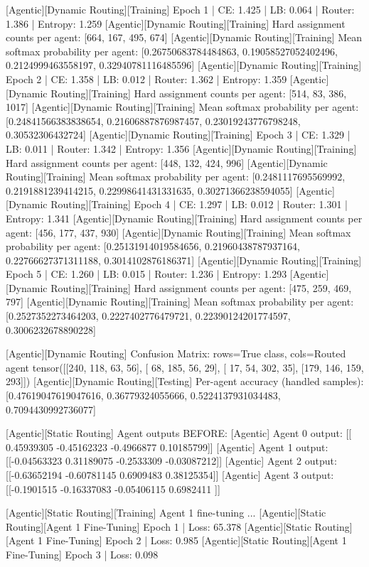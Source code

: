 [Agentic][Dynamic Routing][Training] Epoch 1 | CE: 1.425 | LB: 0.064 | Router: 1.386 | Entropy: 1.259
[Agentic][Dynamic Routing][Training] Hard assignment counts per agent: [664, 167, 495, 674]
[Agentic][Dynamic Routing][Training] Mean softmax probability per agent: [0.26750683784484863, 0.19058527052402496, 0.2124999463558197, 0.32940781116485596]
[Agentic][Dynamic Routing][Training] Epoch 2 | CE: 1.358 | LB: 0.012 | Router: 1.362 | Entropy: 1.359
[Agentic][Dynamic Routing][Training] Hard assignment counts per agent: [514, 83, 386, 1017]
[Agentic][Dynamic Routing][Training] Mean softmax probability per agent: [0.24841566383838654, 0.21606887876987457, 0.23019243776798248, 0.30532306432724]
[Agentic][Dynamic Routing][Training] Epoch 3 | CE: 1.329 | LB: 0.011 | Router: 1.342 | Entropy: 1.356
[Agentic][Dynamic Routing][Training] Hard assignment counts per agent: [448, 132, 424, 996]
[Agentic][Dynamic Routing][Training] Mean softmax probability per agent: [0.2481117695569992, 0.2191881239414215, 0.22998641431331635, 0.30271366238594055]
[Agentic][Dynamic Routing][Training] Epoch 4 | CE: 1.297 | LB: 0.012 | Router: 1.301 | Entropy: 1.341
[Agentic][Dynamic Routing][Training] Hard assignment counts per agent: [456, 177, 437, 930]
[Agentic][Dynamic Routing][Training] Mean softmax probability per agent: [0.25131914019584656, 0.21960438787937164, 0.22766627371311188, 0.3014102876186371]
[Agentic][Dynamic Routing][Training] Epoch 5 | CE: 1.260 | LB: 0.015 | Router: 1.236 | Entropy: 1.293
[Agentic][Dynamic Routing][Training] Hard assignment counts per agent: [475, 259, 469, 797]
[Agentic][Dynamic Routing][Training] Mean softmax probability per agent: [0.2527352273464203, 0.2227402776479721, 0.22390124201774597, 0.3006232678890228]

[Agentic][Dynamic Routing] Confusion Matrix: rows=True class, cols=Routed agent
tensor([[240, 118,  63,  56],
[ 68, 185,  56,  29],
[ 17,  54, 302,  35],
[179, 146, 159, 293]])
[Agentic][Dynamic Routing][Testing] Per-agent accuracy (handled samples): [0.47619047619047616, 0.36779324055666, 0.5224137931034483, 0.7094430992736077]

[Agentic][Static Routing] Agent outputs BEFORE:
[Agentic] Agent 0 output: [[ 0.45939305 -0.45162323 -0.4966877   0.10185799]]
[Agentic] Agent 1 output: [[-0.04563323  0.31189075 -0.2533309  -0.03087212]]
[Agentic] Agent 2 output: [[-0.63652194 -0.60781145  0.6909483   0.38125354]]
[Agentic] Agent 3 output: [[-0.1901515  -0.16337083 -0.05406115  0.6982411 ]]

[Agentic][Static Routing][Training] Agent 1 fine-tuning ...
[Agentic][Static Routing][Agent 1 Fine-Tuning] Epoch 1 | Loss: 65.378
[Agentic][Static Routing][Agent 1 Fine-Tuning] Epoch 2 | Loss: 0.985
[Agentic][Static Routing][Agent 1 Fine-Tuning] Epoch 3 | Loss: 0.098

